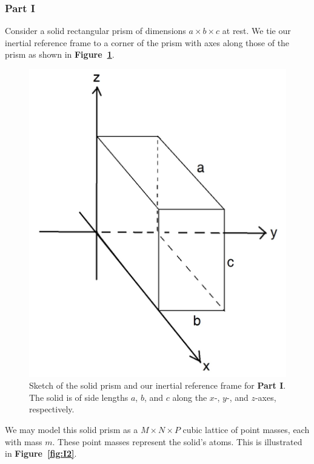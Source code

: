 \documentclass[letterpaper,12pt]{article}
\begin{document}
\begin{flushleft}
    \subsubsection*{Part I}
    Consider a solid rectangular prism of dimensions $a \times b \times c$ at rest. We tie our inertial reference frame to a corner of the prism with axes along those of the prism as shown in \textbf{Figure~\ref{fig:I1}}.
    \begin{figure}[h]
        \centering
        \includegraphics[scale=0.8]{images/i1.jpg}
        \caption{Sketch of the solid prism and our inertial reference frame for \textbf{Part I}. The solid is of side lengths $a$, $b$, and $c$ along the $x$-, $y$-, and $z$-axes, respectively.}
        \label{fig:I1}
    \end{figure}
    We may model this solid prism as a $M \times N \times P$ cubic lattice of point masses, each with mass $m$. These point masses represent the solid's atoms. This is illustrated in \textbf{Figure~\ref{fig:I2}}.
    \begin{figure}[h]
        \centering
        \begin{subfigure}[b]{0.6\textwidth}

\end{subfigure}
\end{figure}
\end{flushleft}
\end{document}

